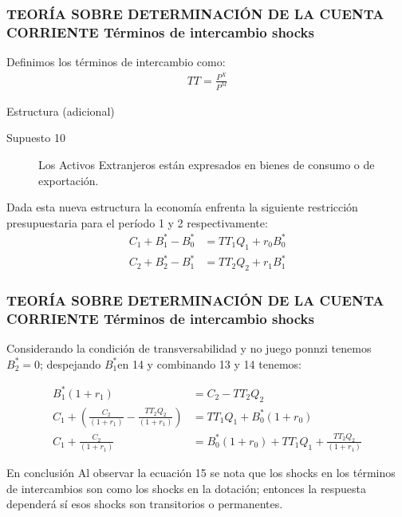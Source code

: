 \documentclass[10pt, xcolor=table, x11names]{beamer}
\begin{document}
\begin{frame}[label=12]
	\frametitle{{\normalsize TEORÍA SOBRE DETERMINACIÓN DE LA CUENTA CORRIENTE} {Términos de intercambio shocks}}
	Definimos los términos de intercambio como:\\
	\begin{align}
	TT=\frac{P^{X}}{P^{M}}\nonumber 
	\end{align}
	\begin{block} {Estructura (adicional)}
		\begin{description}
			\item[Supuesto 10] Los Activos Extranjeros están expresados en bienes de consumo o de exportación. 
		\end{description}
	\end{block}	
	Dada esta nueva estructura la economía enfrenta la siguiente restricción presupuestaria para el período 1 y 2 respectivamente:
	\begin{align}
	C_{1}+B_{1}^{*}-B_{0}^{*}&=TT_{1}Q_{1}+r_{0}B_{0}^{*}\\
	C_{2}+B_{2}^{*}-B_{1}^{*}&=TT_{2}Q_{2}+r_{1}B_{1}^{*}
	\end{align}
	
\end{frame}
\begin{frame}[label=13]
	\frametitle{{\normalsize TEORÍA SOBRE DETERMINACIÓN DE LA CUENTA CORRIENTE} {Términos de intercambio shocks}}
Considerando la condición de transversabilidad y no juego ponnzi tenemos $B_{2}^{*}=0$; despejando $B_{1}^{*}$en 14 y combinando 13 y 14 tenemos:

	\begin{align}
	B_{1}^{*}(1+r_{1})&=C_{2}-TT_{2}Q_{2}\nonumber \\
	C_{1}+(\frac{C_{2}}{(1+r_{1})}-\frac{TT_{2}Q_{2}}{(1+r_{1})})&=TT_{1}Q_{1}+B_{0}^{*}(1+r_{0})\nonumber \\
	C_{1}+\frac{C_{2}}{(1+r_{1})}&=B_{0}^{*}(1+r_{0})+TT_{1}Q_{1}+\frac{TT_{2}Q_{2}}{(1+r_{1})}
	\end{align}
\begin{block} {En conclusión }
	Al observar la ecuación 15 se nota que los shocks en los términos de intercambios son como los shocks en la dotación; entonces la respuesta dependerá sí esos shocks son transitorios o permanentes.
\end{block}	 	
\end{frame}
\end{document}
